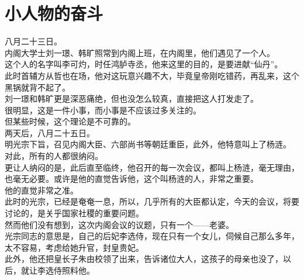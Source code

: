 \section{小人物的奋斗}
\ifnum{}
	\begin{multicols}{\theparacolNo}
\fi
八月二十三日。\\

内阁大学士刘一璟、韩旷照常到内阁上班，在内阁里，他们遇见了一个人。\\

这个人的名字叫李可灼，时任鸿胪寺丞，他来这里的目的，是要进献“仙丹”。\\

此时首辅方从哲也在场，他对这玩意兴趣不大，毕竟皇帝刚吃错药，再乱来，这个黑锅就背不起了。\\

刘一璟和韩旷更是深恶痛绝，但也没怎么较真，直接把这人打发走了。\\

很明显，这是一件小事，而小事是不应该过多关注的。\\

但某些时候，这个理论是不可靠的。\\

两天后，八月二十五日。\\

明光宗下旨，召见内阁大臣、六部尚书等朝廷重臣，此外，他特意叫上了杨涟。\\

对此，所有的人都很纳闷。\\

更让人纳闷的是，此后直至临终，他召开的每一次会议，都叫上杨涟，毫无理由，也毫无必要。或许是他的直觉告诉他，这个叫杨涟的人，非常之重要。\\

他的直觉非常之准。\\

此时的光宗，已经是奄奄一息，所以，几乎所有的大臣都认定，今天的会议，将要讨论的，是关乎国家社稷的重要问题。\\

然而他们没有想到，这次内阁会议的议题，只有一个——老婆。\\

光宗同志的意思是，自己的后妃李选侍，现在只有一个女儿，伺候自己那么多年，太不容易，考虑给她升官，封皇贵妃。\\

此外，他还把皇长子朱由校领了出来，告诉诸位大人，这孩子的母亲也没了，以后，就让李选侍照料他。\\


\end{multicols}
